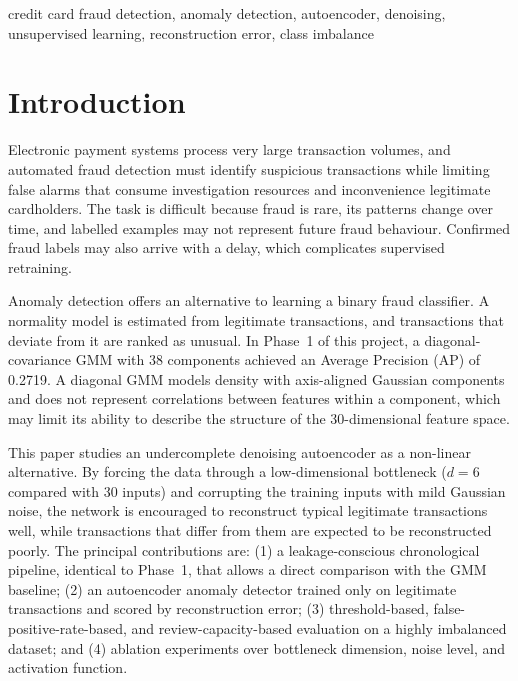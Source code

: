 \documentclass[conference]{IEEEtran}
\begin{document}
\begin{IEEEkeywords}
credit card fraud detection, anomaly detection, autoencoder, denoising, unsupervised learning, reconstruction error, class imbalance
\end{IEEEkeywords}

\section{Introduction}
Electronic payment systems process very large transaction volumes, and automated fraud detection must identify suspicious transactions while limiting false alarms that consume investigation resources and inconvenience legitimate cardholders. The task is difficult because fraud is rare, its patterns change over time, and labelled examples may not represent future fraud behaviour. Confirmed fraud labels may also arrive with a delay, which complicates supervised retraining.

Anomaly detection offers an alternative to learning a binary fraud classifier. A normality model is estimated from legitimate transactions, and transactions that deviate from it are ranked as unusual. In Phase~1 of this project, a diagonal-covariance GMM with 38 components achieved an Average Precision (AP) of 0.2719. A diagonal GMM models density with axis-aligned Gaussian components and does not represent correlations between features within a component, which may limit its ability to describe the structure of the 30-dimensional feature space.

This paper studies an undercomplete denoising autoencoder as a non-linear alternative. By forcing the data through a low-dimensional bottleneck ($d=6$ compared with 30 inputs) and corrupting the training inputs with mild Gaussian noise, the network is encouraged to reconstruct typical legitimate transactions well, while transactions that differ from them are expected to be reconstructed poorly. The principal contributions are: (1) a leakage-conscious chronological pipeline, identical to Phase~1, that allows a direct comparison with the GMM baseline; (2) an autoencoder anomaly detector trained only on legitimate transactions and scored by reconstruction error; (3) threshold-based, false-positive-rate-based, and review-capacity-based evaluation on a highly imbalanced dataset; and (4) ablation experiments over bottleneck dimension, noise level, and activation function.
\end{document}
